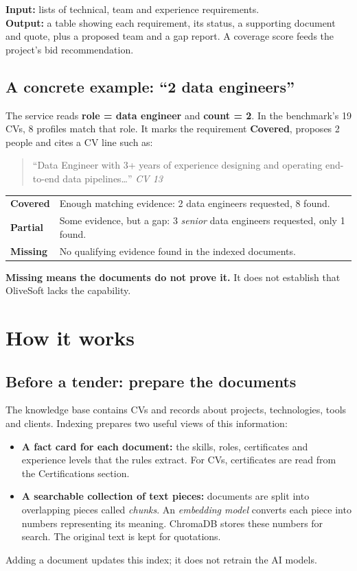 \documentclass[11pt,a4paper]{article}
\begin{document}
\textbf{Input:} lists of technical, team and experience requirements.\\
\textbf{Output:} a table showing each requirement, its status, a supporting document and quote, plus a proposed team and a gap report. A coverage score feeds the project's bid recommendation.

\subsection{A concrete example: ``2 data engineers''}
The service reads \textbf{role = data engineer} and \textbf{count = 2}. In the benchmark's 19 CVs, 8 profiles match that role. It marks the requirement \textbf{Covered}, proposes 2 people and cites a CV line such as:

\begin{quote}\small
``Data Engineer with 3+ years of experience designing and operating end-to-end data pipelines\ldots'' \hfill\textit{CV 13}
\end{quote}

\begin{tabularx}{\textwidth}{@{}>{\bfseries}p{2.1cm}Y@{}}
\toprule
Covered & Enough matching evidence: 2 data engineers requested, 8 found.\\
Partial & Some evidence, but a gap: 3 \emph{senior} data engineers requested, only 1 found.\\
Missing & No qualifying evidence found in the indexed documents.\\
\bottomrule
\end{tabularx}
\par\smallskip
\textbf{Missing means the documents do not prove it.} It does not establish that OliveSoft lacks the capability.

\newpage
\section{How it works}

\subsection{Before a tender: prepare the documents}
The knowledge base contains CVs and records about projects, technologies, tools and clients. Indexing prepares two useful views of this information:
\begin{itemize}
\item \textbf{A fact card for each document:} the skills, roles, certificates and experience levels that the rules extract. For CVs, certificates are read from the Certifications section.
\item \textbf{A searchable collection of text pieces:} documents are split into overlapping pieces called \emph{chunks}. An \emph{embedding model} converts each piece into numbers representing its meaning. ChromaDB stores these numbers for search. The original text is kept for quotations.
\end{itemize}
Adding a document updates this index; it does not retrain the AI models.
\end{document}

